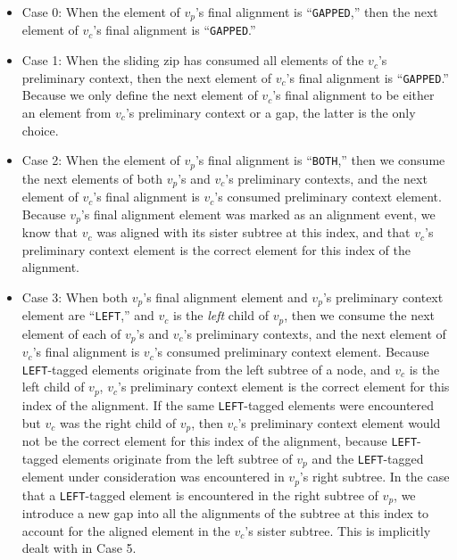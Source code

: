 \documentclass{bmcart}
\begin{document}
\begin{itemize}

  \item Case 0: When the element of $v_p$'s final alignment is ``\texttt{GAPPED},'' then the next element of $v_c$'s final alignment is ``\texttt{GAPPED}.''

  \item Case 1: When the sliding zip has consumed all elements of the $v_c$'s preliminary context, then the next element of $v_c$'s final alignment is ``\texttt{GAPPED}.''
  Because we only define the next element of $v_c$'s final alignment to be either an element from $v_c$'s preliminary context or a gap, the latter is the only choice.

  \item Case 2: When the element of $v_p$'s final alignment is ``\texttt{BOTH},'' then we consume the next elements of both $v_p$'s and $v_c$'s preliminary contexts, and the next element of $v_c$'s final alignment is $v_c$'s consumed preliminary context element.
  Because $v_p$'s final alignment element was marked as an alignment event, we know that $v_c$ was aligned with its sister subtree at this index, and that $v_c$'s preliminary context element is the correct element for this index of the alignment.
  
  \item Case 3: When both $v_p$'s final alignment element and $v_p$'s preliminary context element are ``\texttt{LEFT},'' and $v_c$ is the \textit{left} child of $v_p$, then we consume the next element of each of $v_p$'s and $v_c$'s preliminary contexts, and the next element of $v_c$'s final alignment is $v_c$'s consumed preliminary context element.
  Because \texttt{LEFT}-tagged elements originate from the left subtree of a node, and $v_c$ is the left child of $v_p$, $v_c$'s preliminary context element is the correct element for this index of the alignment.
  If the same \texttt{LEFT}-tagged elements were encountered but $v_c$ was the right child of $v_p$, then $v_c$'s preliminary context element would not be the correct element for this index of the alignment, because \texttt{LEFT}-tagged elements originate from the left subtree of $v_p$ and the \texttt{LEFT}-tagged element under consideration was encountered in $v_p$'s right subtree.
  In the case that a \texttt{LEFT}-tagged element is encountered in the right subtree of $v_p$, we introduce a new gap into all the alignments of the subtree at this index to account for the aligned element in the $v_c$'s sister subtree.
  This is implicitly dealt with in Case 5.
  

\end{itemize}
\end{document}
